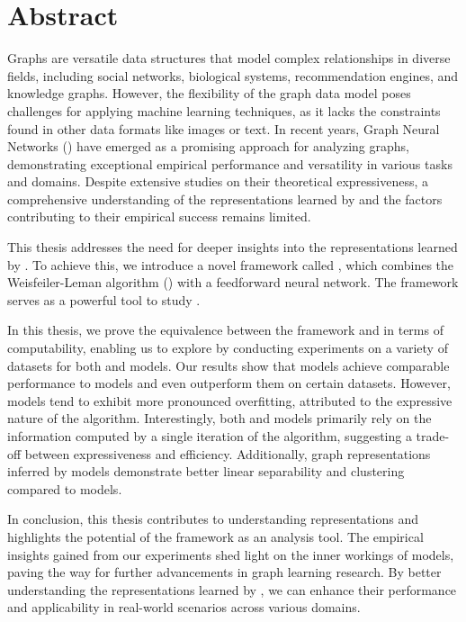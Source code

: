\chapter*{Abstract}
Graphs are versatile data structures that model complex relationships in diverse fields, including social networks, biological systems, recommendation engines, and knowledge graphs. However, the flexibility of the graph data model poses challenges for applying machine learning techniques, as it lacks the constraints found in other data formats like images or text. In recent years, \textsf{Graph Neural Networks} (\gnns) have emerged as a promising approach for analyzing graphs, demonstrating exceptional empirical performance and versatility in various tasks and domains. Despite extensive studies on their theoretical expressiveness, a comprehensive understanding of the representations learned by \gnns and the factors contributing to their empirical success remains limited.

This thesis addresses the need for deeper insights into the representations learned by \gnns. To achieve this, we introduce a novel framework called \wlnn, which combines the Weisfeiler-Leman algorithm (\wl) with a feedforward neural network. The \wlnn framework serves as a powerful tool to study \gnns.

In this thesis, we prove the equivalence between the \wlnn framework and \gnns in terms of computability, enabling us to explore \gnns by conducting experiments on a variety of datasets for both \wlnn and \gnn models. Our results show that \wlnn models achieve comparable performance to \gnn models and even outperform them on certain datasets. However, \wlnn models tend to exhibit more pronounced overfitting, attributed to the expressive nature of the \wl algorithm. Interestingly, both \wlnn and \gnn models primarily rely on the information computed by a single iteration of the \wl algorithm, suggesting a trade-off between expressiveness and efficiency. Additionally, graph representations inferred by \gnn models demonstrate better linear separability and clustering compared to \wlnn models.

In conclusion, this thesis contributes to understanding \gnn representations and highlights the potential of the \wlnn framework as an analysis tool. The empirical insights gained from our experiments shed light on the inner workings of \gnn models, paving the way for further advancements in graph learning research. By better understanding the representations learned by \gnns, we can enhance their performance and applicability in real-world scenarios across various domains.